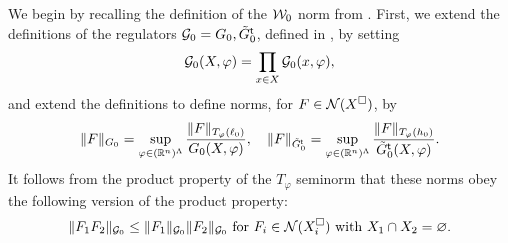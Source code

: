 We begin by recalling the definition of the $\mathcal{W}_0$ norm from \cite{BS-rg-step}.
First,
we extend the definitions of the regulators $\mathcal{G}_0 = G_0, \tilde G_0^{\sf t}$,
defined in , by setting
\begin{equation} \label{e:Gcalprod}
\mathcal{G}_0(X, \varphi) = \prod_{x\in X} \mathcal{G}_0(x, \varphi),
\end{equation}
and extend the definitions  to define norms, for $F \in \mathcal{N}(X^\Box)$, by
\begin{equation}
\lbeq{reg0X}
    \|F\|_{G_0} = \sup_{\varphi\in(\R^n)^\Lambda} \frac{\|F\|_{T_\varphi(\ell_0)}}{G_0(X,\varphi)}
    , \quad
    \|F\|_{\tilde{G}^{\sf t}_0} = \sup_{\varphi\in(\R^n)^\Lambda} \frac{\|F\|_{T_\varphi(h_0)}}{\tilde{G}^{\sf t}_0(X,\varphi)}
    .
\end{equation}
It follows from the product property of the $T_\varphi$ seminorm that these norms obey
the following version of the product property:
\begin{equation}
\|F_1F_2\|_{\mathcal{G}_0} \le   \|F_1\|_{\mathcal{G}_0} \|F_2\|_{\mathcal{G}_0}
\text{ for }
F_i\in \mathcal{N}(X_i^\Box)  \text{ with } X_1 \cap X_2=\varnothing.
\end{equation}

